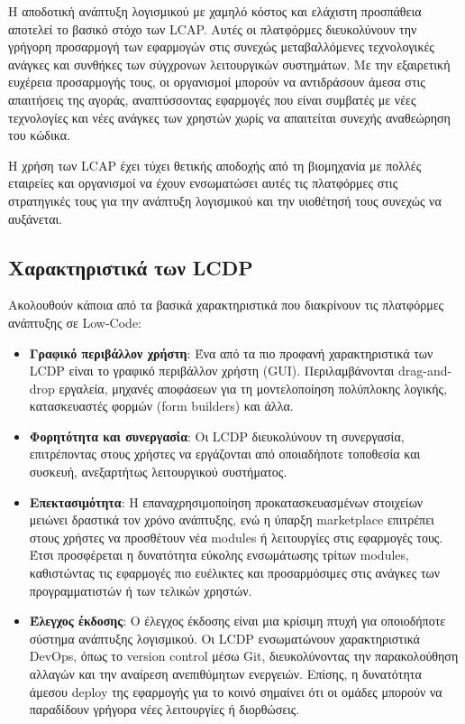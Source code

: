         Η αποδοτική ανάπτυξη λογισμικού με χαμηλό κόστος και ελάχιστη προσπάθεια αποτελεί το βασικό στόχο των LCAP. Αυτές οι πλατφόρμες διευκολύνουν την γρήγορη προσαρμογή των εφαρμογών στις συνεχώς μεταβαλλόμενες τεχνολογικές ανάγκες και συνθήκες των σύγχρονων λειτουργικών συστημάτων. Με την εξαιρετική ευχέρεια προσαρμογής τους, οι οργανισμοί μπορούν να αντιδράσουν άμεσα στις απαιτήσεις της αγοράς, αναπτύσσοντας εφαρμογές που είναι συμβατές με νέες τεχνολογίες και νέες ανάγκες των χρηστών χωρίς να απαιτείται συνεχής αναθεώρηση του κώδικα.

        Η χρήση των LCAP έχει τύχει θετικής αποδοχής από τη βιομηχανία με πολλές εταιρείες και οργανισμοί να έχουν ενσωματώσει αυτές τις πλατφόρμες στις στρατηγικές τους για την ανάπτυξη λογισμικού και την υιοθέτησή τους συνεχώς να αυξάνεται. \cite{Bock2021,Bucaioni2022,Sahay2020}

        \subsection{Χαρακτηριστικά των LCDP}
            Ακολουθούν κάποια από τα βασικά χαρακτηριστικά που διακρίνουν τις πλατφόρμες ανάπτυξης σε Low-Code:

            \begin{itemize}[label={\tiny \blacksquare}]
                \setlength\itemsep{-0.25em}
                \item \textbf{Γραφικό περιβάλλον χρήστη}: Ένα από τα πιο προφανή χαρακτηριστικά των LCDP είναι το γραφικό περιβάλλον χρήστη (GUI). Περιλαμβάνονται drag-and-drop εργαλεία, μηχανές αποφάσεων για τη μοντελοποίηση πολύπλοκης λογικής, κατασκευαστές φορμών (form builders) και άλλα.

                \item \textbf{Φορητότητα και συνεργασία}: Οι LCDP διευκολύνουν τη συνεργασία, επιτρέποντας στους χρήστες να εργάζονται από οποιαδήποτε τοποθεσία και συσκευή, ανεξαρτήτως λειτουργικού συστήματος.

                \item \textbf{Επεκτασιμότητα}: Η επαναχρησιμοποίηση προκατασκευασμένων στοιχείων μειώνει δραστικά τον χρόνο ανάπτυξης, ενώ η ύπαρξη marketplace επιτρέπει στους χρήστες να προσθέτουν νέα modules ή λειτουργίες στις εφαρμογές τους. Έτσι προσφέρεται η δυνατότητα εύκολης ενσωμάτωσης τρίτων modules, καθιστώντας τις εφαρμογές πιο ευέλικτες και προσαρμόσιμες στις ανάγκες των προγραμματιστών ή των τελικών χρηστών.

                \item \textbf{Έλεγχος έκδοσης}: Ο έλεγχος έκδοσης είναι μια κρίσιμη πτυχή για οποιοδήποτε σύστημα ανάπτυξης λογισμικού. Οι LCDP ενσωματώνουν χαρακτηριστικά DevOps, όπως το version control μέσω Git, διευκολύνοντας την παρακολούθηση αλλαγών και την αναίρεση ανεπιθύμητων ενεργειών. Επίσης, η δυνατότητα άμεσου deploy της εφαρμογής για το κοινό σημαίνει ότι οι ομάδες μπορούν να παραδίδουν γρήγορα νέες λειτουργίες ή διορθώσεις.
            \end{itemize}



